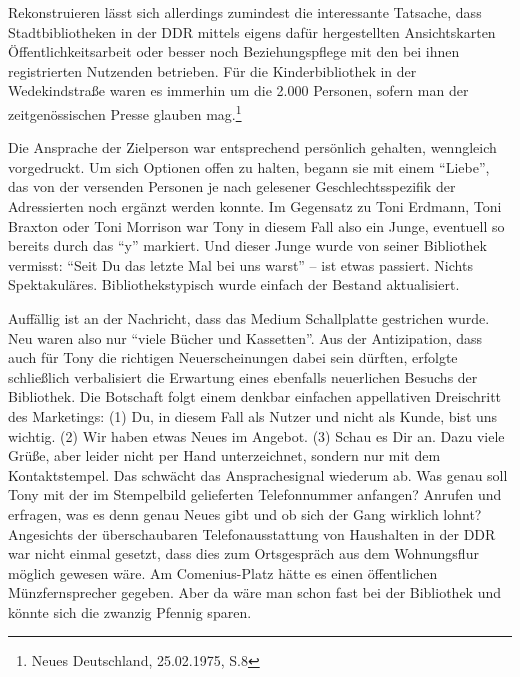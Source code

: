 \documentclass[a4paper,
fontsize=11pt,
oneside,
numbers=noperiodatend,
parskip=half-,
bibliography=totoc,
final
]{scrartcl}
\begin{document}
Rekonstruieren lässt sich allerdings zumindest die interessante
Tatsache, dass Stadtbibliotheken in der DDR mittels eigens dafür
hergestellten Ansichtskarten Öffentlichkeitsarbeit oder besser noch
Beziehungspflege mit den bei ihnen registrierten Nutzenden betrieben.
Für die Kinderbibliothek in der Wedekindstraße waren es immerhin um die
2.000 Personen, sofern man der zeitgenössischen Presse glauben
mag.\footnote{Neues Deutschland, 25.02.1975, S.8}

Die Ansprache der Zielperson war entsprechend persönlich gehalten,
wenngleich vorgedruckt. Um sich Optionen offen zu halten, begann sie mit
einem \enquote{Liebe}, das von der versenden Personen je nach gelesener
Geschlechtsspezifik der Adressierten noch ergänzt werden konnte. Im
Gegensatz zu Toni Erdmann, Toni Braxton oder Toni Morrison war Tony in
diesem Fall also ein Junge, eventuell so bereits durch das \enquote{y}
markiert. Und dieser Junge wurde von seiner Bibliothek vermisst:
\enquote{Seit Du das letzte Mal bei uns warst} -- ist etwas passiert.
Nichts Spektakuläres. Bibliothekstypisch wurde einfach der Bestand
aktualisiert.

Auffällig ist an der Nachricht, dass das Medium Schallplatte gestrichen
wurde. Neu waren also nur \enquote{viele Bücher und Kassetten}. Aus der
Antizipation, dass auch für Tony die richtigen Neuerscheinungen dabei
sein dürften, erfolgte schließlich verbalisiert die Erwartung eines
ebenfalls neuerlichen Besuchs der Bibliothek. Die Botschaft folgt einem
denkbar einfachen appellativen Dreischritt des Marketings: (1) Du, in
diesem Fall als Nutzer und nicht als Kunde, bist uns wichtig. (2) Wir
haben etwas Neues im Angebot. (3) Schau es Dir an. Dazu viele Grüße,
aber leider nicht per Hand unterzeichnet, sondern nur mit dem
Kontaktstempel. Das schwächt das Ansprachesignal wiederum ab. Was genau
soll Tony mit der im Stempelbild gelieferten Telefonnummer anfangen?
Anrufen und erfragen, was es denn genau Neues gibt und ob sich der Gang
wirklich lohnt? Angesichts der überschaubaren Telefonausstattung von
Haushalten in der DDR war nicht einmal gesetzt, dass dies zum
Ortsgespräch aus dem Wohnungsflur möglich gewesen wäre. Am
Comenius-Platz hätte es einen öffentlichen Münzfernsprecher gegeben.
Aber da wäre man schon fast bei der Bibliothek und könnte sich die
zwanzig Pfennig sparen.
\end{document}
